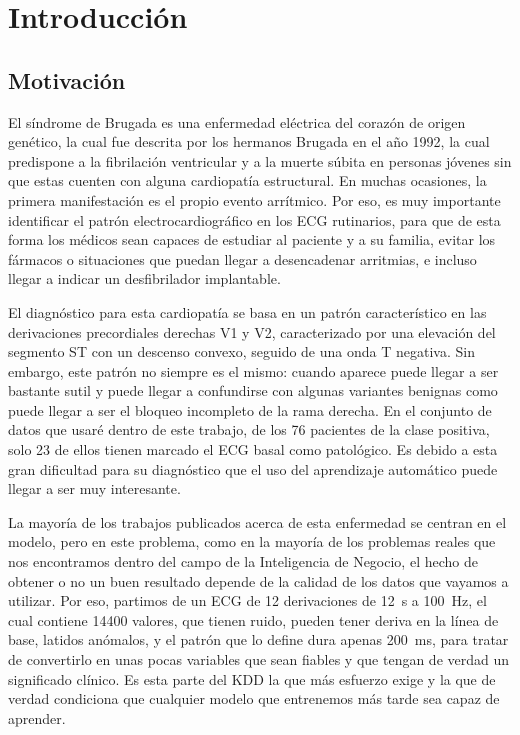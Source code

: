 \clearpage
\section{Introducción}\label{cap:introduccion}

\subsection{Motivación}

El síndrome de Brugada es una enfermedad eléctrica del corazón de origen genético, la cual fue descrita por los hermanos Brugada en el año 1992, la cual predispone a la fibrilación ventricular y a la muerte súbita en personas jóvenes sin que estas cuenten con alguna cardiopatía estructural. En muchas ocasiones, la primera manifestación es el propio evento arrítmico. Por eso, es muy importante identificar el patrón electrocardiográfico en los ECG rutinarios, para que de esta forma los médicos sean capaces de estudiar al paciente y a su familia, evitar los fármacos o situaciones que puedan llegar a desencadenar arritmias, e incluso llegar a indicar un desfibrilador implantable.

El diagnóstico para esta cardiopatía se basa en un patrón característico en las derivaciones precordiales derechas V1 y V2, caracterizado por una elevación del segmento ST con un descenso convexo, seguido de una onda T negativa. Sin embargo, este patrón no siempre es el mismo: cuando aparece puede llegar a ser bastante sutil y puede llegar a confundirse con algunas variantes benignas como puede llegar a ser el bloqueo incompleto de la rama derecha. En el conjunto de datos que usaré dentro de este trabajo, de los 76 pacientes de la clase positiva, solo 23 de ellos tienen marcado el ECG basal como patológico. Es debido a esta gran dificultad para su diagnóstico que el uso del aprendizaje automático puede llegar a ser muy interesante.

La mayoría de los trabajos publicados acerca de esta enfermedad se centran en el modelo, pero en este problema, como en la mayoría de los problemas reales que nos encontramos dentro del campo de la Inteligencia de Negocio, el hecho de obtener o no un buen resultado depende de la calidad de los datos que vayamos a utilizar. Por eso, partimos de un ECG de 12 derivaciones de \SI{12}{\second} a \SI{100}{\hertz}, el cual contiene \num{14400} valores, que tienen ruido, pueden tener deriva en la línea de base, latidos anómalos, y el patrón que lo define dura apenas \SI{200}{\milli\second}, para tratar de convertirlo en unas pocas variables que sean fiables y que tengan de verdad un significado clínico. Es esta parte del KDD la que más esfuerzo exige y la que de verdad condiciona que cualquier modelo que entrenemos más tarde sea capaz de aprender.

